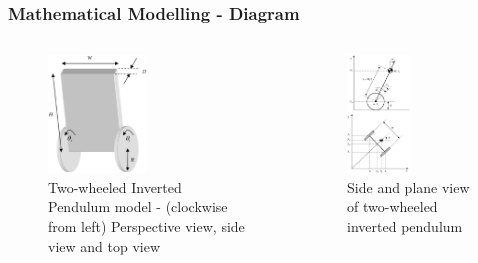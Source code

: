 \documentclass[aspectratio=169]{beamer}
\begin{document}
\begin{frame}
\frametitle{Mathematical Modelling - Diagram}
\begin{columns}[c]

\begin{figure}
	\includegraphics[width=0.5\textwidth]{InvPen.eps}
	\caption	{Two-wheeled Inverted Pendulum model - (clockwise from left) Perspective view, side view and top view}
\end{figure}
\begin{figure}
	\includegraphics[width=0.5\textwidth]{InvPenSideTop.eps}	
	\caption{Side and plane view of two-wheeled inverted pendulum}
\end{figure}
\end{columns}
\end{frame}
\end{document}
